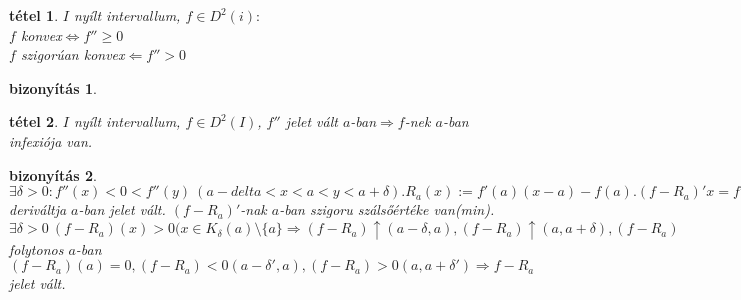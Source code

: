 \documentclass{article}
\newcommand{\exist}{\exists}
\newcommand{\ek}{\Longleftrightarrow}
\newcommand{\nn}{\Rightarrow}
\newcommand{\nb}{\Leftarrow}
\newcommand{\narrow}{\uparrow}
\theoremstyle{magyar}
\newtheorem{te}{tétel}[section]
\newtheorem{bi}{bizonyítás}[section]
\begin{document}
  \begin{te}
    $I$ nyílt intervallum, $f\in D^2(i):$\\
    $f$ konvex$\ek f''\ge0$\\
    $f$ szigorúan konvex$\nb f''>0$
  \end{te}
  \begin{bi}
  \end{bi}
  \begin{te}
    $I$ nyílt intervallum, $f\in D^2(I)$, $f''$ jelet vált $a$-ban$\nn f$-nek $a$-ban infexiója van.
  \end{te}
  \begin{bi}
  $\exist\delta>0: f''(x)<0<f''(y)\ (a-delta<x<a<y<a+\delta). R_a(x):=f'(a)(x-a)-f(a). (f-R_a)'x=f'(x)-f'(a), (f-R_a)'(a)=0, (f-R_a)''(a)=f''(a)=0. (f-R_a)'$ deriváltja $a$-ban jelet vált. $(f-R_a)'$-nak $a$-ban szigoru szálsőértéke van(min). $\exists\delta>0\ (f-R_a)(x)>0 (x\in K_\delta(a)\setminus\{a\}\nn(f-R_a)\narrow(a-\delta,a), (f-R_a)\narrow(a,a+\delta), (f-R_a)$ folytonos $a$-ban $(f-R_a)(a)=0, (f-R_a)<0 (a-\delta',a),(f-R_a)>0(a,a+\delta')\nn f-R_a$ jelet vált.
  \end{bi}
  \newpage
\end{document}
